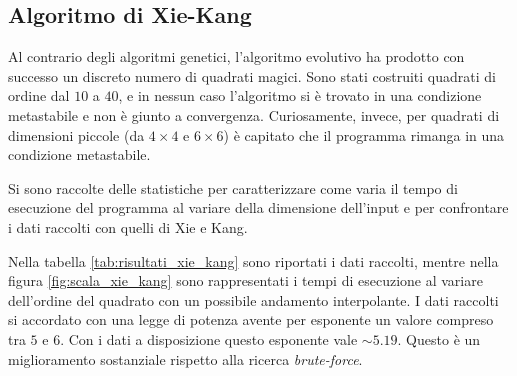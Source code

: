 \documentclass[italian,twoside,twocolumn]{article}
\begin{document}
\subsection{Algoritmo di Xie-Kang}
Al contrario degli algoritmi genetici, l'algoritmo evolutivo ha prodotto con successo un discreto numero di quadrati magici. Sono stati costruiti quadrati di ordine dal $ 10 $ a $ 40 $, e in nessun caso l'algoritmo si è trovato in una condizione metastabile e non è giunto a convergenza. Curiosamente, invece, per quadrati di dimensioni piccole (da $ 4\times 4 $ e $ 6\times6 $) è capitato che il programma rimanga in una condizione metastabile. 

Si sono raccolte delle statistiche per caratterizzare come varia il tempo di esecuzione del programma al variare della dimensione dell'input e per confrontare i dati raccolti con quelli di Xie e Kang. 

Nella tabella \ref{tab:risultati_xie_kang} sono riportati i dati raccolti, mentre nella figura \ref{fig:scala_xie_kang} sono rappresentati i tempi di esecuzione al variare dell'ordine del quadrato con un possibile andamento interpolante. I dati raccolti si accordato con una legge di potenza avente per esponente un valore compreso tra $ 5 $ e $ 6 $. Con i dati a disposizione questo esponente vale $ \sim \num{5.19} $. Questo è un miglioramento sostanziale rispetto alla ricerca \emph{brute-force}.
\end{document}
